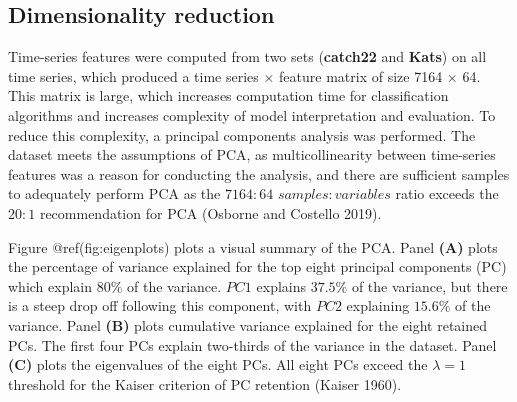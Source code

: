\documentclass{article}
\begin{document}
\hypertarget{dimensionality-reduction}{%
\subsection{Dimensionality reduction}\label{dimensionality-reduction}}

Time-series features were computed from two sets (\textbf{catch22} and
\textbf{Kats}) on all time series, which produced a time series
\(\times\) feature matrix of size 7164 \(\times\) 64. This matrix is
large, which increases computation time for classification algorithms
and increases complexity of model interpretation and evaluation. To
reduce this complexity, a principal components analysis was performed.
The dataset meets the assumptions of PCA, as multicollinearity between
time-series features was a reason for conducting the analysis, and there
are sufficient samples to adequately perform PCA as the \(7164:64\)
\(samples:variables\) ratio exceeds the \(20:1\) recommendation for PCA
(Osborne and Costello 2019).

Figure @ref(fig:eigenplots) plots a visual summary of the PCA. Panel
\textbf{(A)} plots the percentage of variance explained for the top
eight principal components (PC) which explain 80\(\%\) of the variance.
\(PC 1\) explains \(37.5\%\) of the variance, but there is a steep drop
off following this component, with \(PC 2\) explaining \(15.6\%\) of the
variance. Panel \textbf{(B)} plots cumulative variance explained for the
eight retained PCs. The first four PCs explain two-thirds of the
variance in the dataset. Panel \textbf{(C)} plots the eigenvalues of the
eight PCs. All eight PCs exceed the \(\lambda = 1\) threshold for the
Kaiser criterion of PC retention (Kaiser 1960).
\end{document}
